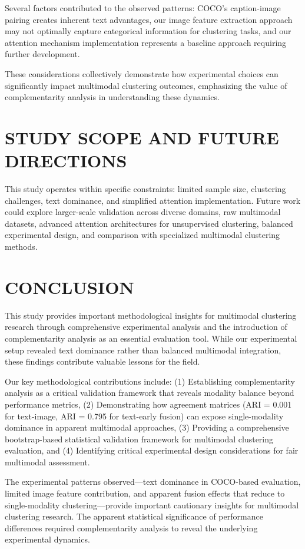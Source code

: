 \documentclass[sigconf]{acmart}
\begin{document}
Several factors contributed to the observed patterns: COCO's caption-image pairing creates inherent text advantages, our image feature extraction approach may not optimally capture categorical information for clustering tasks, and our attention mechanism implementation represents a baseline approach requiring further development.

These considerations collectively demonstrate how experimental choices can significantly impact multimodal clustering outcomes, emphasizing the value of complementarity analysis in understanding these dynamics.

\section{STUDY SCOPE AND FUTURE DIRECTIONS}

This study operates within specific constraints: limited sample size, clustering challenges, text dominance, and simplified attention implementation. Future work could explore larger-scale validation across diverse domains, raw multimodal datasets, advanced attention architectures for unsupervised clustering, balanced experimental design, and comparison with specialized multimodal clustering methods.

\section{CONCLUSION}

This study provides important methodological insights for multimodal clustering research through comprehensive experimental analysis and the introduction of complementarity analysis as an essential evaluation tool. While our experimental setup revealed text dominance rather than balanced multimodal integration, these findings contribute valuable lessons for the field.

Our key methodological contributions include: (1) Establishing complementarity analysis as a critical validation framework that reveals modality balance beyond performance metrics, (2) Demonstrating how agreement matrices (ARI = 0.001 for text-image, ARI = 0.795 for text-early fusion) can expose single-modality dominance in apparent multimodal approaches, (3) Providing a comprehensive bootstrap-based statistical validation framework for multimodal clustering evaluation, and (4) Identifying critical experimental design considerations for fair multimodal assessment.

The experimental patterns observed—text dominance in COCO-based evaluation, limited image feature contribution, and apparent fusion effects that reduce to single-modality clustering—provide important cautionary insights for multimodal clustering research. The apparent statistical significance of performance differences required complementarity analysis to reveal the underlying experimental dynamics.
\end{document}
